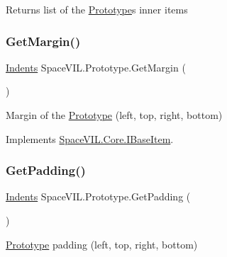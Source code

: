 Returns list of the \mbox{\hyperlink{class_space_v_i_l_1_1_prototype}{Prototype}}\textquotesingle{}s inner items 

\mbox{\label{class_space_v_i_l_1_1_prototype_aff828c5a3ba3253b301f93ecdb8e4876}} 
\subsubsection{\texorpdfstring{Get\+Margin()}{GetMargin()}}
{\footnotesize\ttfamily \mbox{\hyperlink{struct_space_v_i_l_1_1_decorations_1_1_indents}{Indents}} Space\+V\+I\+L.\+Prototype.\+Get\+Margin (\begin{DoxyParamCaption}{ }\end{DoxyParamCaption})}



Margin of the \mbox{\hyperlink{class_space_v_i_l_1_1_prototype}{Prototype}} (left, top, right, bottom) 



Implements \mbox{\hyperlink{interface_space_v_i_l_1_1_core_1_1_i_base_item}{Space\+V\+I\+L.\+Core.\+I\+Base\+Item}}.

\mbox{\label{class_space_v_i_l_1_1_prototype_a861ce67e320359dc1bf36a68b2a039b4}} 
\subsubsection{\texorpdfstring{Get\+Padding()}{GetPadding()}}
{\footnotesize\ttfamily \mbox{\hyperlink{struct_space_v_i_l_1_1_decorations_1_1_indents}{Indents}} Space\+V\+I\+L.\+Prototype.\+Get\+Padding (\begin{DoxyParamCaption}{ }\end{DoxyParamCaption})}



\mbox{\hyperlink{class_space_v_i_l_1_1_prototype}{Prototype}} padding (left, top, right, bottom) 

\mbox{\label{class_space_v_i_l_1_1_prototype_a52d0e3c6f4e673553cd78fad20bded6b}} 
